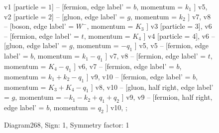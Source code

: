 \documentclass{revtex4}
\begin{document}
\begin{figure}[!htb]
\begin{center}
{    %
v1 [particle = \(1\)] -- [fermion, edge label' = \(b\), momentum = \(k_{1}\) ] v5, 
v2 [particle = \(2\)] -- [gluon, edge label' = \(g\), momentum = \(k_{2}\) ] v7, 
v8 -- [boson, edge label' = \(W^{-}\), momentum = \(K_{3}\) ] v3 [particle = \(3\)], 
v6 -- [fermion, edge label' = \(t\), momentum = \(K_{4}\) ] v4 [particle = \(4\)], 
v6 -- [gluon, edge label' = \(g\), momentum = \(-q_{1}\) ] v5, 
v5 -- [fermion, edge label' = \(b\), momentum = \(k_{1} - q_{1}\) ] v7, 
v8 -- [fermion, edge label' = \(t\), momentum = \(K_{4} - q_{1}\) ] v6, 
v7 -- [fermion, edge label' = \(b\), momentum = \(k_{1} + k_{2} - q_{1}\) ] v9, 
v10 -- [fermion, edge label' = \(b\), momentum = \(K_{3} + K_{4} - q_{1}\) ] v8, 
v10 -- [gluon, half right, edge label' = \(g\), momentum = \(-k_{1} - k_{2} + q_{1} + q_{2}\) ] v9, 
v9 -- [fermion, half right, edge label' = \(b\), momentum = \(q_{2}\) ] v10, 
};
\end{center}
\caption{Diagram268, Sign: 1, Symmetry factor: 1}
\end{figure}
\newpage
\end{document}
